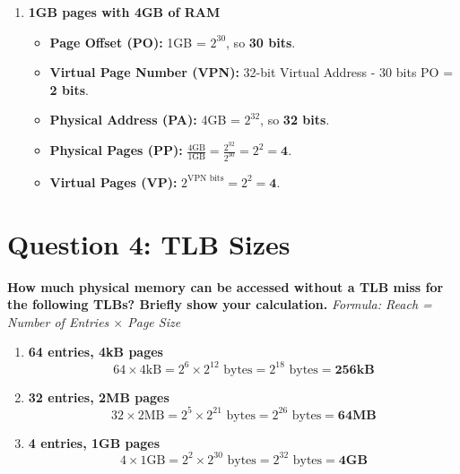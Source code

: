 \documentclass[12pt]{article}
\begin{document}
\begin{enumerate}[label=\textbf{\Alph*)}]
    \item \textbf{1GB pages with 4GB of RAM}
    \begin{itemize}
        \item \textbf{Page Offset (PO):} 1GB = $2^{30}$, so \textbf{30 bits}.
        \item \textbf{Virtual Page Number (VPN):} 32-bit Virtual Address - 30 bits PO = \textbf{2 bits}.
        \item \textbf{Physical Address (PA):} 4GB = $2^{32}$, so \textbf{32 bits}.
        \item \textbf{Physical Pages (PP):} $\frac{4\text{GB}}{1\text{GB}} = \frac{2^{32}}{2^{30}} = 2^2 = \mathbf{4}$.
        \item \textbf{Virtual Pages (VP):} $2^{\text{VPN bits}} = 2^2 = \mathbf{4}$.
    \end{itemize}
\end{enumerate}

\vspace{0.5cm}

\newpage

\section*{Question 4: TLB Sizes}
\noindent \textbf{How much physical memory can be accessed without a TLB miss for the following TLBs? Briefly show your calculation.}
\noindent \textit{Formula: Reach = Number of Entries $\times$ Page Size}

\begin{enumerate}[label=\textbf{\Alph*.}]
    \item \textbf{64 entries, 4kB pages}
    \[ 64 \times 4\text{kB} = 2^6 \times 2^{12}\text{ bytes} = 2^{18}\text{ bytes} = \mathbf{256\text{kB}} \]
    
    \item \textbf{32 entries, 2MB pages}
    \[ 32 \times 2\text{MB} = 2^5 \times 2^{21}\text{ bytes} = 2^{26}\text{ bytes} = \mathbf{64\text{MB}} \]
    
    \item \textbf{4 entries, 1GB pages}
    \[ 4 \times 1\text{GB} = 2^2 \times 2^{30}\text{ bytes} = 2^{32}\text{ bytes} = \mathbf{4\text{GB}} \]
\end{enumerate}
\end{document}
